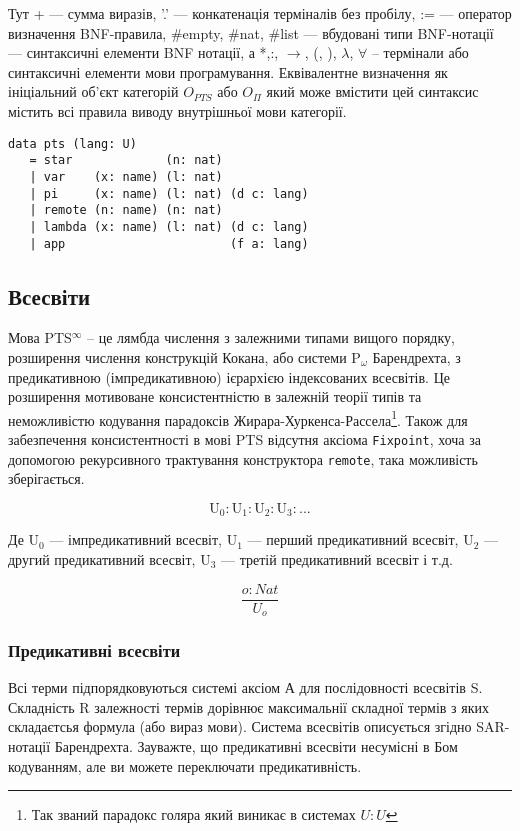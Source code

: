 Тут + --- сумма виразів, '.' --- конкатенація терміналів без пробілу,
:= --- оператор визначення BNF-правила, \#empty, \#nat, \#list --- вбудовані типи BNF-нотації
--- синтаксичні елементи BNF нотації,
а *,:, $\rightarrow$, (, ), $\lambda$, $\forall$ -- термінали або синтаксичні елементи мови програмування.
Еквівалентне визначення як ініціальний об'єкт категорій $O_{PTS}$ або $O_\Pi$
який може вмістити цей синтаксис містить всі правила виводу
внутрішньої мови категорії.

\begin{lstlisting}[mathescape=true]
data pts (lang: U)
   = star             (n: nat)
   | var    (x: name) (l: nat)
   | pi     (x: name) (l: nat) (d c: lang)
   | remote (n: name) (n: nat)
   | lambda (x: name) (l: nat) (d c: lang)
   | app                       (f a: lang)
\end{lstlisting}

\subsection*{Всесвіти}
Мова PTS$^\infty$ -- це лямбда числення з залежними типами вищого порядку,
розширення числення конструкцій Кокана, або системи P$_\omega$ Барендрехта,
з предикативною (імпредикативною) ієрархією індексованих всесвітів.
Це розширення мотивоване консистентністю\cite{Lof75} в залежній теорії типів та
неможливістю кодування парадоксів Жирара-Хуркенса-Рассела\footnote{Так званий парадокс голяра який виникає в системах $U : U$}. Також для
забезпечення консистентності в мові PTS відсутня аксіома \lstinline{Fixpoint}, хоча
за допомогою рекурсивного трактування конструктора \lstinline{remote},
така можливість зберігається.

$$
    \mathrm{U_0} : \mathrm{U}_1 : \mathrm{U}_2 : \mathrm{U}_3 : ...
$$

Де $\mathrm{U_0}$ --- імпредикативний всесвіт,
   $\mathrm{U_1}$ --- перший предикативний всесвіт,
   $\mathrm{U_2}$ --- другий предикативний всесвіт,
   $\mathrm{U_3}$ --- третій предикативний всесвіт і т.д.

\begin{equation}
\tag{S}
\dfrac
{o : Nat}
{U_o}
\end{equation}

\subsubsection*{Предикативні всесвіти}
Всі терми підпорядковуються системі аксіом А для послідовності всесвітів S.
Складність R залежності термів дорівнює максимальнії складної термів з
яких складаєтсья формула (або вираз мови). Система всесвітів описується
згідно SAR-нотації Барендрехта. Зауважте, що предикативні всесвіти
несумісні в Бом кодуванням, але ви можете переключати предикативність.

